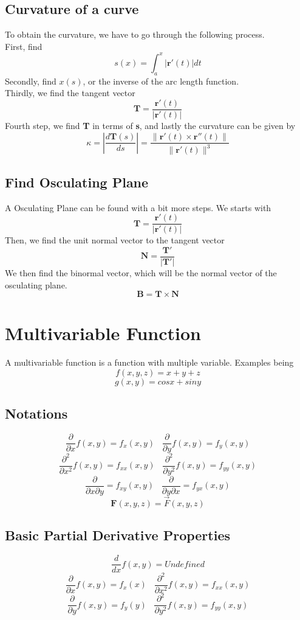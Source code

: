 \documentclass[12pt]{book}
\newcommand{\pypx}[2]{\frac{\partial #1}{\partial #2}}
\newcommand{\dydx}[2]{\frac{d #1}{d #2}}
\newcommand{\abso}[1]{\left|#1 \right|}
\begin{document}
\subsection{Curvature of a curve}
To obtain the curvature, we have to go through the following process.\\
\newline
First, find
\[
s(x) = \int_{a}^{x} \abso{\textbf{r}'(t)} dt
\]
Secondly, find $x(s)$, or the inverse of the arc length function.\\
\newline
Thirdly, we find the tangent vector
\[
\textbf{T} = \frac{\textbf{r}'(t)}{\abso{\textbf{r}'(t)}} 
\]
Fourth step, we find \textbf{T} in terms of \textbf{s}, and lastly the curvature can be given by
\[
\kappa = \abso{\frac{d\textbf{T}(s)}{ds}}=\frac{\|\mathbf{r}'(t) \times \mathbf{r}''(t)\|}{\|\mathbf{r}'(t)\|^3}
\]
\subsection{Find Osculating Plane}
A Osculating Plane can be found with a bit more steps. We starts with 
\[
\textbf{T} = \frac{\textbf{r}'(t)}{\abso{\textbf{r}'(t)}} 
\]
Then, we find the unit normal vector to the tangent vector
\[
\textbf{N} = \frac{\textbf{T}'}{\abso{\textbf{T}'}}
\]
We then find the binormal vector, which will be the normal vector of the osculating plane. 
\[
\textbf{B} = \textbf{T} \times \textbf{N}
\]
\section{Multivariable Function}
A multivariable function is a function with multiple variable. Examples being
\[
f(x,y,z) = x+y+z
\]
\[
g(x,y) = cosx+siny
\]

\subsection{Notations}
\[
\pypx{}{x}f(x,y) = f_x(x,y) \;\;\; \pypx{}{y}f(x,y) = f_y(x,y) 
\]
\[
\pypx{^2}{x^2}f(x,y) = f_{xx}(x,y)  \;\;\; \pypx{^2}{y^2}f(x,y) = f_{yy}(x,y) 
\]
\[
\pypx{}{x \partial y} = f_{xy}(x,y)  \;\;\; \pypx{}{y \partial x} = f_{yx}(x,y) 
\]
\[
\textbf{F}(x,y,z) = \Vec{F}(x,y,z)
\]
\subsection{Basic Partial Derivative Properties}
\[
\dydx{}{x} f(x,y) = Undefined
\]
\[
\pypx{}{x} f(x,y) = f_x(x) \;\;\; \pypx{^2}{x^2} f(x,y) = f_{xx} (x,y)
\]
\[
\pypx{}{y} f(x,y) = f_y(y) \;\;\; \pypx{^2}{y^2} f(x,y) = f_{yy} (x,y)
\]
\end{document}
